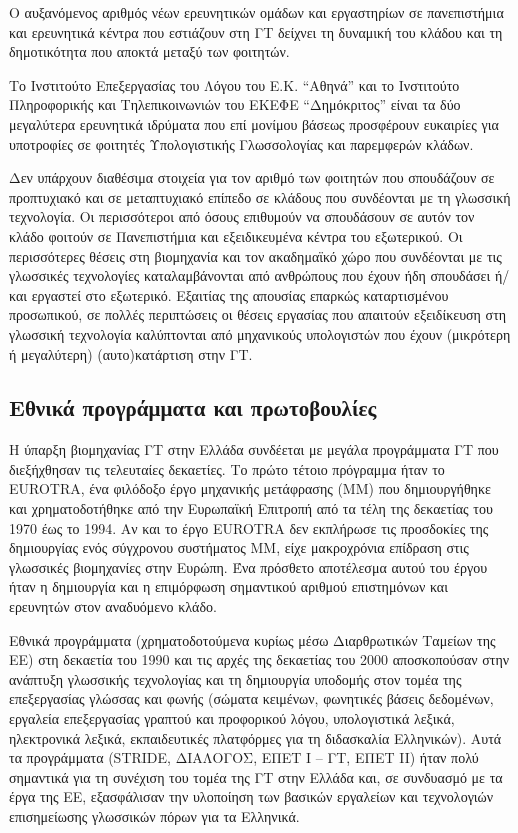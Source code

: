 \begin{multicols}{2}
Ο αυξανόμενος αριθμός νέων ερευνητικών ομάδων και εργαστηρίων σε πανεπιστήμια και ερευνητικά κέντρα που εστιάζουν στη ΓΤ δείχνει τη δυναμική του κλάδου και τη δημοτικότητα που αποκτά μεταξύ των φοιτητών.

Το Ινστιτούτο Επεξεργασίας του Λόγου του Ε.Κ. “Αθηνά” και το Ινστιτούτο Πληροφορικής και Τηλεπικοινωνιών του ΕΚΕΦΕ “Δημόκριτος” είναι τα δύο μεγαλύτερα ερευνητικά ιδρύματα που επί μονίμου βάσεως προσφέρουν ευκαιρίες για υποτροφίες σε φοιτητές Υπολογιστικής Γλωσσολογίας και παρεμφερών κλάδων.

Δεν υπάρχουν διαθέσιμα στοιχεία για τον αριθμό των φοιτητών που σπουδάζουν σε προπτυχιακό και σε μεταπτυχιακό επίπεδο σε κλάδους που συνδέονται με τη γλωσσική τεχνολογία. Οι περισσότεροι από όσους επιθυμούν να σπουδάσουν σε αυτόν τον κλάδο φοιτούν σε Πανεπιστήμια και εξειδικευμένα κέντρα του εξωτερικού. Οι περισσότερες θέσεις στη βιομηχανία και τον ακαδημαϊκό χώρο που συνδέονται με τις γλωσσικές τεχνολογίες καταλαμβάνονται από ανθρώπους που έχουν ήδη σπουδάσει ή/και εργαστεί στο εξωτερικό. Εξαιτίας της απουσίας επαρκώς καταρτισμένου προσωπικού, σε πολλές περιπτώσεις οι θέσεις εργασίας που απαιτούν εξειδίκευση στη γλωσσική τεχνολογία καλύπτονται από μηχανικούς υπολογιστών που έχουν (μικρότερη ή μεγαλύτερη) (αυτο)κατάρτιση στην ΓΤ.

\subsection{Εθνικά προγράμματα και πρωτοβουλίες}

Η ύπαρξη βιομηχανίας ΓΤ στην Ελλάδα συνδέεται με μεγάλα προγράμματα ΓΤ που διεξήχθησαν τις τελευταίες δεκαετίες. Το πρώτο τέτοιο πρόγραμμα ήταν το EUROTRA, ένα φιλόδοξο έργο μηχανικής μετάφρασης (ΜΜ) που δημιουργήθηκε και χρηματοδοτήθηκε από την Ευρωπαϊκή Επιτροπή από τα τέλη της δεκαετίας του 1970 έως το 1994. Αν και το έργο EUROTRA δεν εκπλήρωσε τις προσδοκίες της δημιουργίας ενός σύγχρονου συστήματος MΜ,  είχε μακροχρόνια επίδραση στις γλωσσικές βιομηχανίες στην Ευρώπη. Ένα πρόσθετο αποτέλεσμα αυτού του έργου ήταν η δημιουργία και η επιμόρφωση σημαντικού αριθμού επιστημόνων και ερευνητών στον αναδυόμενο κλάδο. 

Εθνικά προγράμματα (χρηματοδοτούμενα κυρίως μέσω Διαρθρωτικών Ταμείων της ΕΕ) στη δεκαετία του 1990 και τις αρχές της δεκαετίας του 2000 αποσκοπούσαν στην ανάπτυξη γλωσσικής τεχνολογίας και τη δημιουργία υποδομής στον τομέα της επεξεργασίας γλώσσας και φωνής (σώματα κειμένων, φωνητικές βάσεις δεδομένων, εργαλεία επεξεργασίας γραπτού και προφορικού λόγου, υπολογιστικά λεξικά, ηλεκτρονικά λεξικά, εκπαιδευτικές πλατφόρμες για τη διδασκαλία Ελληνικών). Αυτά τα προγράμματα (STRIDE, ΔΙΑΛΟΓΟΣ, ΕΠΕΤ I – ΓΤ, ΕΠΕΤ II) ήταν πολύ σημαντικά για  τη συνέχιση του τομέα της ΓΤ στην Ελλάδα και, σε συνδυασμό με τα έργα της ΕΕ, εξασφάλισαν την υλοποίηση των βασικών εργαλείων και τεχνολογιών επισημείωσης γλωσσικών πόρων για τα Ελληνικά.


\end{multicols}
